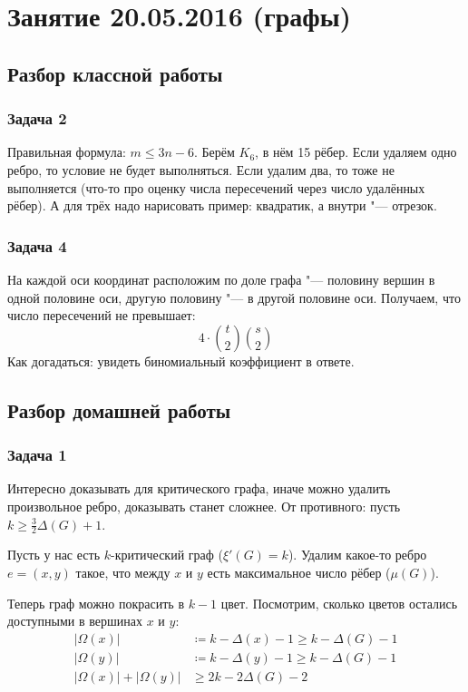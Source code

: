 \chapter{Занятие 20.05.2016 (графы)}

\section{Разбор классной работы}

\subsection{Задача 2}
	Правильная формула: $m \le 3n - 6$.
	Берём $K_6$, в нём 15 рёбер.
	Если удаляем одно ребро, то условие не будет выполняться.
	Если удалим два, то тоже не выполняется (\TODO что-то про оценку числа пересечений через число удалённых рёбер).
	А для трёх надо нарисовать пример: квадратик, а внутри "--- отрезок.

\subsection{Задача 4}
	На каждой оси координат расположим по доле графа "--- половину вершин в одной
	половине оси, другую половину "--- в другой половине оси.
	Получаем, что число пересечений не превышает:
	\[ 4 \cdot \binom{t}{2} \binom{s}{2} \]
	Как догадаться: увидеть биномиальный коэффициент в ответе.

\section{Разбор домашней работы}
\subsection{Задача 1}
	Интересно доказывать для критического графа, иначе можно удалить произвольное ребро, доказывать станет сложнее.
	От противного: пусть $k \ge \frac32 \Delta(G) + 1$.

	Пусть у нас есть $k$-критический граф ($\xi'(G)=k$).
	Удалим какое-то ребро $e=(x, y)$ такое, что между $x$ и $y$ есть максимальное число рёбер ($\mu(G)$).

	Теперь граф можно покрасить в $k-1$ цвет.
	Посмотрим, сколько цветов остались доступными в вершинах $x$ и $y$:
	\begin{align*}
		|\Omega(x)| &\coloneq k - \Delta(x) - 1 \ge k - \Delta(G) - 1 \\
		|\Omega(y)| &\coloneq k - \Delta(y) - 1 \ge k - \Delta(G) - 1 \\
		|\Omega(x)| + |\Omega(y)| &\ge 2k - 2\Delta(G) - 2 \\
	\end{align*}
	
